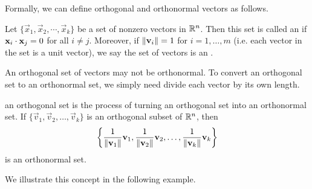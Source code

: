 \documentclass{ximera}
\begin{document}
Formally, we can define orthogonal and orthonormal vectors as follows.

\begin{definition}\label{orthset}
Let $\{ \vec{x}_1, \vec{x}_2, \cdots, \vec{x}_k \}$ be a set of nonzero
vectors in $\mathbb{R}^n$. Then this set is called an
 if 
$\mathbf{x}_i \cdot \mathbf{x}_j = 0$ for all $i \neq j$.
Moreover, if $\left\lVert\mathbf{v}_i\right\rVert=1$ for $i=1,\ldots,m$ (i.e. each vector in the set is a unit vector), we say the set of vectors is an .
\end{definition}

An orthogonal set of vectors may not be orthonormal.  To convert an orthogonal set to an orthonormal set, we simply need divide each vector by its own length.

\begin{definition}\label{normalizing}
 an orthogonal set is the process of turning an orthogonal set into an orthonormal set.
If $\{ \vec{v}_1, \vec{v}_2, \ldots, \vec{v}_k\}$
is an orthogonal subset of $\mathbb{R}^n$,
then
\[ \left\{
\frac{1}{\left\lVert\mathbf{v}_1\right\rVert}\mathbf{v}_1,
\frac{1}{\left\lVert\mathbf{v}_2\right\rVert}\mathbf{v}_2, \ldots,
\frac{1}{\left\lVert\mathbf{v}_k\right\rVert}\mathbf{v}_k \right\}
\]
is an orthonormal set.
\end{definition}

We illustrate this concept in the following example.
\end{document}
